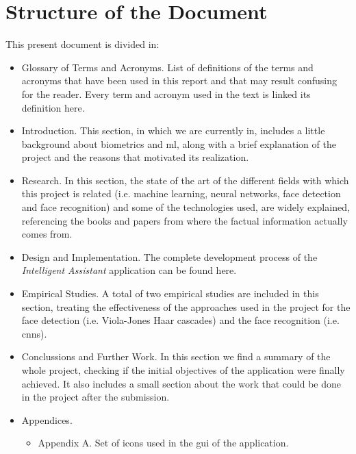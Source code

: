 \section{Structure of the Document}
This present document is divided in:

\begin{itemize}
	\item Glossary of Terms and Acronyms. List of definitions of the terms and acronyms that have been used in this report and that may result confusing for the reader. Every term and acronym used in the text is linked its definition here.
	\item Introduction. This section, in which we are currently in, includes a little background about biometrics and \gls{ml}, along with a brief explanation of the project and the reasons that motivated its realization.  
	\item Research. In this section, the state of the art of the different fields with which this project is related (i.e. machine learning, neural networks, face detection and face recognition) and some of the technologies used, are widely explained, referencing the books and papers from where the factual information actually comes from. 
	\item Design and Implementation. The complete development process of the \textit{Intelligent Assistant} application can be found here.
	\item Empirical Studies. A total of two empirical studies are included in this section, treating the effectiveness of the approaches used in the project for the face detection (i.e. Viola-Jones Haar cascades) and the face recognition (i.e. \glspl{cnn}).
	\item Conclussions and Further Work. In this section we find a summary of the whole project, checking if the initial objectives of the application were finally achieved. It also includes a small section about the work that could be done in the project after the submission.	
	\item Appendices. 
	\begin{itemize}
		\item Appendix A. Set of icons used in the \gls{gui} of the application.
	\end{itemize}
\end{itemize}



